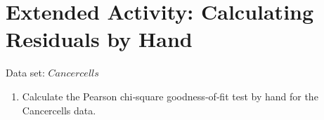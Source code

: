 \documentclass[
]{report}
\providecommand{\tightlist}{%
  \setlength{\itemsep}{0pt}\setlength{\parskip}{0pt}}
\begin{document}
\hypertarget{extended-activity-calculating-residuals-by-hand-1}{%
\section*{Extended Activity: Calculating Residuals by Hand}\label{extended-activity-calculating-residuals-by-hand-1}}

Data set: \(Cancercells\)

\begin{enumerate}
\def\labelenumi{\arabic{enumi}.}
\setcounter{enumi}{28}
\tightlist
\item
  Calculate the Pearson chi‐square goodness‐of‐fit test by hand for the Cancercells data.\\
\end{enumerate}
\end{document}
